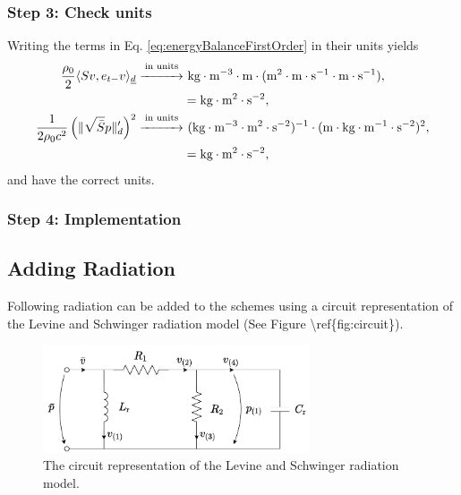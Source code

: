 {\subsubsection{Step 3: Check units}
Writing the terms in Eq. \eqref{eq:energyBalanceFirstOrder} in their units yields
\begin{align*}
    \frac{\rho_0}{2}\langle Sv, e_{t-}v\rangle_{\underline{d}}\overset{\text{in units}}{\xrightarrow{\hspace*{1cm}}}& \ \text{kg}\cdot \text{m}^{-3}\cdot \text{m} \cdot (\text{m}^2 \cdot \text{m}\cdot\text{s}^{-1} \cdot \text{m}\cdot\text{s}^{-1}),\\
    & = \text{kg} \cdot \text{m}^2 \cdot \text{s}^{-2},\\
    \frac{1}{2\rho_0 c^2}\left(\lVert\sqrt{\bar S }p\rVert'_d\right)^2\overset{\text{in units}}{\xrightarrow{\hspace*{1cm}}}&\  (\text{kg} \cdot \text{m}^{-3} \cdot \text{m}^2 \cdot \text{s}^{-2})^{-1} \cdot(\text{m} \cdot \text{kg} \cdot \text{m}^{-1}\cdot \text{s}^{-2})^2,\\
    &= \text{kg} \cdot \text{m}^2 \cdot \text{s}^{-2},
\end{align*}
and have the correct units.
\subsubsection{Step 4: Implementation}


\subsection{Adding Radiation}
\def\r{\text{r}}
\def\one{{(1)}}
Following \cite{Harrison2018} radiation  can be added to the schemes using a circuit representation of the Levine and Schwinger radiation model (See Figure \textbackslash ref\{fig:circuit\}). 
\begin{figure}[h]
    \centering
    \includegraphics[width=0.7\textwidth]{figures/resonators/brass/circuit.pdf}
    \caption{The circuit representation of the Levine and Schwinger radiation model. \label{fig:circuit}}
\end{figure}

}
